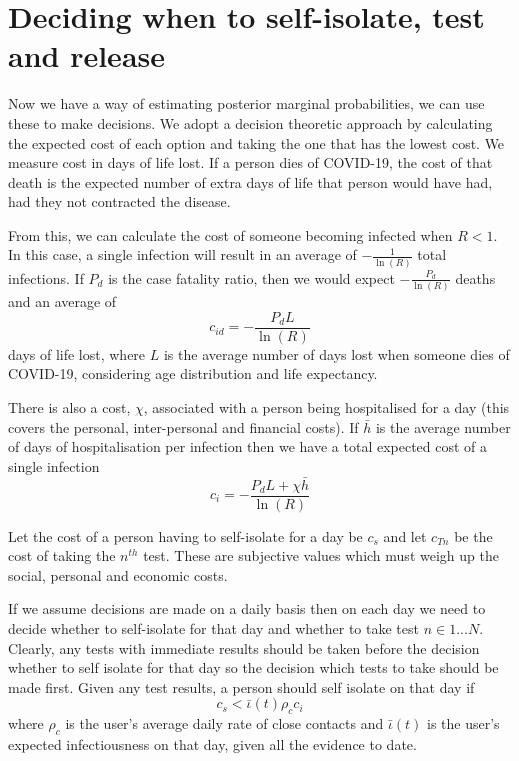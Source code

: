 \documentclass{article}
\begin{document}
\section{Deciding when to self-isolate, test and release}
Now we have a way of estimating posterior marginal probabilities, we can use these to make decisions. We adopt a decision theoretic approach by calculating the expected cost of each option and taking the one that has the lowest cost. We measure cost in days of life lost. If a person dies of COVID-19, the cost of that death is the expected number of extra days of life that person would have had, had they not contracted the disease.

From this, we can calculate the cost of someone becoming infected when $R<1$. In this case, a single infection will result in an average of $-\frac{1}{\ln(R)}$ total infections. If $P_d$ is the case fatality ratio, then we would expect $-\frac{P_d}{\ln(R)}$ deaths and an average of
\[
c_{id} = -\frac{P_dL}{\ln(R)}
\]
days of life lost, where $L$ is the average number of days lost when someone dies of COVID-19, considering age distribution and life expectancy.

There is also a cost, $\chi$, associated with a person being hospitalised for a day (this covers the personal, inter-personal and financial costs). If $\bar{h}$ is the average number of days of hospitalisation per infection then we have a total expected cost of a single infection
\[
c_{i} = -\frac{P_dL + \chi\bar{h}}{\ln(R)}
\]

Let the cost of a person having to self-isolate for a day be $c_s$ and let $c_{Tn}$ be the cost of taking the $n^{th}$ test. These are subjective values which must weigh up the social, personal and economic costs.

If we assume decisions are made on a daily basis then on each day we need to decide whether to self-isolate for that day and whether to take test $n \in 1...N$. Clearly, any tests with immediate results should be taken before the decision whether to self isolate for that day so the decision which tests to take should be made first. Given any test results, a person should self isolate on that day if
\[
c_s < \bar{\iota}(t)\rho_cc_i
\]
where $\rho_c$ is the user's average daily rate of close contacts and $\bar{\iota}(t)$ is the user's expected infectiousness on that day, given all the evidence to date.
\end{document}
